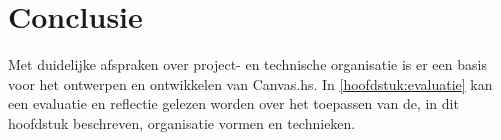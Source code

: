 \section{Conclusie}
Met duidelijke afspraken over project- en technische organisatie is er een basis voor het ontwerpen en ontwikkelen van Canvas.hs. In \autoref{hoofdstuk:evaluatie} kan een evaluatie en reflectie gelezen worden over het toepassen van de, in dit hoofdstuk beschreven, organisatie vormen en technieken. 
